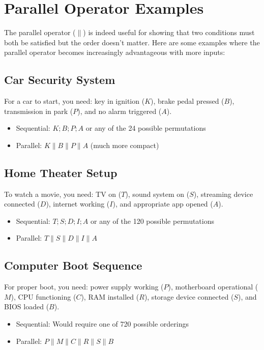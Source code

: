 
\section*{Parallel Operator Examples}

The parallel operator ($\|$) is indeed useful for showing that two conditions must both be satisfied but the order doesn't matter. Here are some examples where the parallel operator becomes increasingly advantageous with more inputs:

\subsection*{Car Security System}
For a car to start, you need: key in ignition ($K$), brake pedal pressed ($B$), transmission in park ($P$), and no alarm triggered ($A$).
\begin{itemize}
    \item Sequential: $K;B;P;A$ or any of the 24 possible permutations
    \item Parallel: $K\|B\|P\|A$ (much more compact)
\end{itemize}

\subsection*{Home Theater Setup}
To watch a movie, you need: TV on ($T$), sound system on ($S$), streaming device connected ($D$), internet working ($I$), and appropriate app opened ($A$).
\begin{itemize}
    \item Sequential: $T;S;D;I;A$ or any of the 120 possible permutations
    \item Parallel: $T\|S\|D\|I\|A$
\end{itemize}

\subsection*{Computer Boot Sequence}
For proper boot, you need: power supply working ($P$), motherboard operational ($M$), CPU functioning ($C$), RAM installed ($R$), storage device connected ($S$), and BIOS loaded ($B$).
\begin{itemize}
    \item Sequential: Would require one of 720 possible orderings
    \item Parallel: $P\|M\|C\|R\|S\|B$
\end{itemize}

